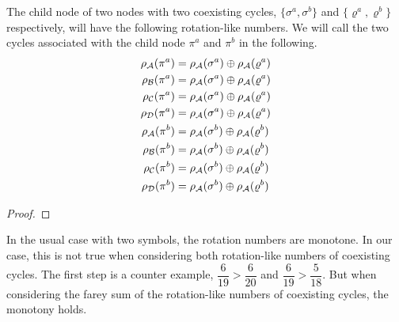 
\begin{theorem}
    The child node of two nodes with two coexisting cycles, $\{\sigma^a, \sigma^b\}$ and $\{\varrho^a, \varrho^b\}$ respectively, will have the following rotation-like numbers.
    We will call the two cycles associated with the child node $\pi^a$ and $\pi^b$ in the following.
    \begin{align*}
        \rho_{\mathcal{A}}(\pi^a) & = \rho_{\mathcal{A}}(\sigma^a) \oplus \rho_{\mathcal{A}}(\varrho^a) \\
        \rho_{\mathcal{B}}(\pi^a) & = \rho_{\mathcal{A}}(\sigma^a) \oplus \rho_{\mathcal{A}}(\varrho^a) \\
        \rho_{\mathcal{C}}(\pi^a) & = \rho_{\mathcal{A}}(\sigma^a) \oplus \rho_{\mathcal{A}}(\varrho^a) \\
        \rho_{\mathcal{D}}(\pi^a) & = \rho_{\mathcal{A}}(\sigma^a) \oplus \rho_{\mathcal{A}}(\varrho^a) \\
        \rho_{\mathcal{A}}(\pi^b) & = \rho_{\mathcal{A}}(\sigma^b) \oplus \rho_{\mathcal{A}}(\varrho^b) \\
        \rho_{\mathcal{B}}(\pi^b) & = \rho_{\mathcal{A}}(\sigma^b) \oplus \rho_{\mathcal{A}}(\varrho^b) \\
        \rho_{\mathcal{C}}(\pi^b) & = \rho_{\mathcal{A}}(\sigma^b) \oplus \rho_{\mathcal{A}}(\varrho^b) \\
        \rho_{\mathcal{D}}(\pi^b) & = \rho_{\mathcal{A}}(\sigma^b) \oplus \rho_{\mathcal{A}}(\varrho^b)
    \end{align*}
\end{theorem}

\begin{proof}
\end{proof}

In the usual case with two symbols, the rotation numbers are monotone.
In our case, this is not true when considering both rotation-like numbers of coexisting cycles.
The first step is a counter example, $\dfrac{6}{19} > \dfrac{6}{20}$ and $\dfrac{6}{19} > \dfrac{5}{18}$.
But when considering the farey sum of the rotation-like numbers of coexisting cycles, the monotony holds.

